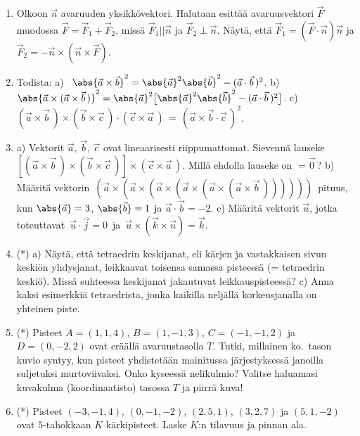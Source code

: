 \begin{enumerate}
\item \label{H-II-8: vektorihajotelma}
Olkoon $\vec n$ avaruuden yksikkövektori. Halutaan esittää avaruusvektori $\vec F$ muodossa
$\vec F= \vec F_1 + \vec F_2$, missä $\vec F_1 || \vec n$ ja $\vec F_2 \perp \vec n$.
Näytä, että $\vec F_1 = (\vec F \cdot \vec n)\vec n$ ja 
$\vec F_2 = -\vec n\times(\vec n\times\vec F)$. 

\item
Todista: \newline
a) \ $\abs{\vec a\times\vec b}^2 = \abs{\vec a}^2\abs{\vec b}^2
                                   -(\vec a\cdot\vec b\,)^2$. \newline
b) \ $\abs{\vec a\times(\vec a\times \vec b\,)}^2
     =\abs{\vec a}^2\bigl[\abs{\vec a}^2\abs{\vec b}^2-(\vec a\cdot\vec b\,)^2\bigr]$. \newline
c) \ $(\vec a\times\vec b\,)\times(\vec b\times\vec c\,)\cdot(\vec c\times\vec a\,)\,
        =\,(\vec a\times\vec b\cdot\vec c\,)^2$.
                                              
\item
a) Vektorit $\vec a,\,\vec b,\,\vec c$ ovat lineaarisesti riippumattomat. Sievennä
lauseke \newline
$[(\vec a\times\vec b\,)\times(\vec b\times\vec c\,)]\times(\vec c\times\vec a\,)$. Millä 
ehdolla lauseke on $=\vec 0$\,? \vspace{1mm}\newline
b) Määritä vektorin $\,(\vec a\times(\vec a\times(\vec a\times(\vec a\times
(\vec a\times(\vec a\times\vec b\,))))))\,$ pituus, kun $\abs{\vec a}=3$, $\abs{\vec b}=1$ ja
$\vec a\cdot\vec b=-2$. \vspace{1mm}\newline
c) Määritä vektorit $\vec u$, jotka toteuttavat $\,\vec u\cdot\vec j=0\,$ ja
$\,\vec u\times(\vec k\times\vec u)=\vec k$.

\item (*) a) Näytä, että tetraedrin keskijanat, eli kärjen ja vastakkaisen sivun keskiön 
yhdysjanat, leikkaavat toisensa samassa pisteessä (= tetraedrin keskiö). Missä suhteessa 
keskijanat jakautuvat leikkauspisteessä? \newline
c) Anna kaksi esimerkkiä tetraedrista, jonka kaikilla neljällä korkeusjanalla on yhteinen piste.

\item (*)
Pisteet $A=(1,1,4)$, $B=(1,-1,3)$, $C=(-1,-1,2)$ ja $D=(0,-2,2)$ ovat eräällä avaruustasolla
$T$. Tutki, millainen ko.\ tason kuvio syntyy, kun pisteet yhdistetään mainitussa
järjestyksessä janoilla suljetuksi murtoviivaksi. Onko kyseessä nelikulmio? Valitse haluamasi 
kuvakulma (koordinaatisto) tasossa $T$ ja piirrä kuva!

\item (*)
Pisteet $(-3,-1,4)$, $(0,-1,-2)$, $(2,5,1)$, $(3,2,7)$ ja $(5,1,-2)$ ovat $5$-tahokkaan $K$
kärkipisteet. Laske $K$:n tilavuus ja pinnan ala.

\end{enumerate}